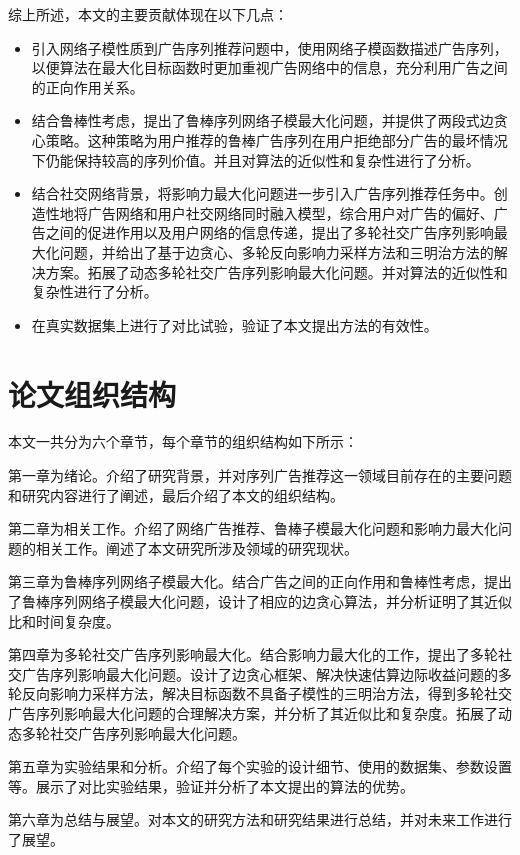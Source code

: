 综上所述，本文的主要贡献体现在以下几点：

\begin{itemize}
\item 引入网络子模性质到广告序列推荐问题中，使用网络子模函数描述广告序列，以便算法在最大化目标函数时更加重视广告网络中的信息，充分利用广告之间的正向作用关系。
\item 结合鲁棒性考虑，提出了鲁棒序列网络子模最大化问题，并提供了两段式边贪心策略。这种策略为用户推荐的鲁棒广告序列在用户拒绝部分广告的最坏情况下仍能保持较高的序列价值。并且对算法的近似性和复杂性进行了分析。
\item 结合社交网络背景，将影响力最大化问题进一步引入广告序列推荐任务中。创造性地将广告网络和用户社交网络同时融入模型，综合用户对广告的偏好、广告之间的促进作用以及用户网络的信息传递，提出了多轮社交广告序列影响最大化问题，并给出了基于边贪心、多轮反向影响力采样方法和三明治方法的解决方案。拓展了动态多轮社交广告序列影响最大化问题。并对算法的近似性和复杂性进行了分析。
\item 在真实数据集上进行了对比试验，验证了本文提出方法的有效性。
\end{itemize}


\section{论文组织结构}

本文一共分为六个章节，每个章节的组织结构如下所示：

第一章为绪论。介绍了研究背景，并对序列广告推荐这一领域目前存在的主要问题和研究内容进行了阐述，最后介绍了本文的组织结构。

第二章为相关工作。介绍了网络广告推荐、鲁棒子模最大化问题和影响力最大化问题的相关工作。阐述了本文研究所涉及领域的研究现状。

第三章为鲁棒序列网络子模最大化。结合广告之间的正向作用和鲁棒性考虑，提出了鲁棒序列网络子模最大化问题，设计了相应的边贪心算法，并分析证明了其近似比和时间复杂度。

第四章为多轮社交广告序列影响最大化。结合影响力最大化的工作，提出了多轮社交广告序列影响最大化问题。设计了边贪心框架、解决快速估算边际收益问题的多轮反向影响力采样方法，解决目标函数不具备子模性的三明治方法，得到多轮社交广告序列影响最大化问题的合理解决方案，并分析了其近似比和复杂度。拓展了动态多轮社交广告序列影响最大化问题。

第五章为实验结果和分析。介绍了每个实验的设计细节、使用的数据集、参数设置等。展示了对比实验结果，验证并分析了本文提出的算法的优势。

第六章为总结与展望。对本文的研究方法和研究结果进行总结，并对未来工作进行了展望。


